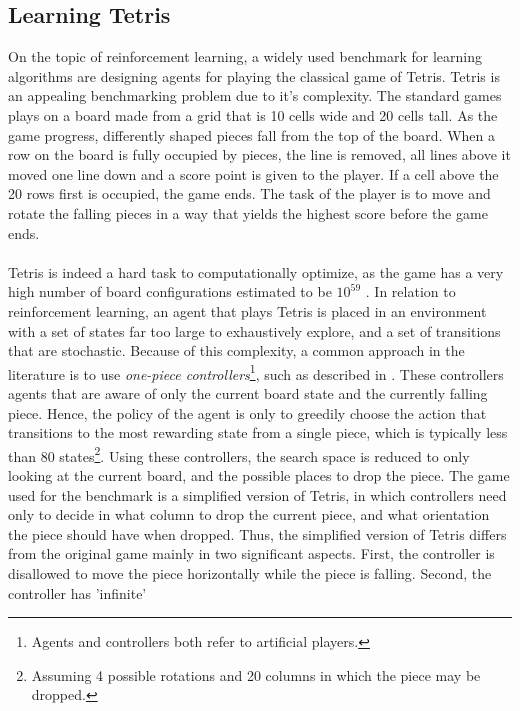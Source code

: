 \subsection{Learning Tetris}

On the topic of reinforcement learning, a widely used benchmark
for learning algorithms are designing agents 
for playing the classical game of Tetris. Tetris is an 
appealing benchmarking problem due to it's complexity. The 
standard games plays on a board made from a grid that is
10 cells wide and 20 cells tall. As the game progress, differently
shaped pieces fall from the top of the board. 
When a row on the board is fully occupied by pieces, the line
is removed, all lines above it moved one line down and a score
point is given to the player. If a cell above the 20 rows first is
occupied, the game ends. The task of the player is to move
and rotate the falling pieces in a way that yields the highest 
score before the game ends.\\
\\
Tetris is indeed a hard task to computationally optimize, as
the game has a very high number of board configurations estimated to be
$10^{59}$ \citep{scherrer2009}. In relation to reinforcement learning,
an agent that plays Tetris is placed in an environment with a set of 
states far too large to exhaustively explore, and a set of transitions
that are stochastic. Because of this
complexity, a common approach 
in the literature is to use 
\textit{one-piece controllers}\footnote{Agents and controllers
both refer to artificial players.}, such as described in 
\cite{scherrer2009:b}. These controllers agents that are aware
of only 
the current board state and the currently falling piece.
Hence, the policy of the agent is only to greedily choose
the action that transitions to the most rewarding state
from a single piece, which is typically less than 80 states\footnote{
Assuming 4 possible rotations and 20 columns
in which the piece may be dropped.}.
Using these controllers, the search space is reduced 
to only looking at the current board, and the possible 
places to drop the piece. The 
game used for the benchmark is a simplified version of Tetris,
in which 
controllers need only to decide in what column to drop the current
piece, and what orientation the piece should have when dropped.
Thus, the simplified version of Tetris differs from the 
original game mainly in two significant aspects. 
First, the controller is 
disallowed to move the piece horizontally while the piece 
is falling. Second, the controller has 'infinite'
